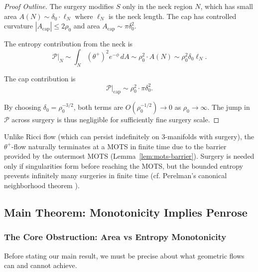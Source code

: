 \begin{proof}[Proof Outline]
The surgery modifies $S$ only in the neck region $N$, which has small area $A(N) \sim \delta_0 \cdot \ell_N$ where $\ell_N$ is the neck length. The cap has controlled curvature $|A_{\text{cap}}| \leq 2\rho_0$ and area $A_{\text{cap}} \sim \pi\delta_0^2$.

The entropy contribution from the neck is
\begin{equation}
\mathcal{P}|_N \sim \int_N (\theta^+)^2 e^{-\phi} \, dA \sim \rho_0^2 \cdot A(N) \sim \rho_0^2 \delta_0 \ell_N.
\end{equation}

The cap contribution is
\begin{equation}
\mathcal{P}|_{\text{cap}} \sim \rho_0^2 \cdot \pi\delta_0^2.
\end{equation}

By choosing $\delta_0 = \rho_0^{-3/2}$, both terms are $O(\rho_0^{-1/2}) \to 0$ as $\rho_0 \to \infty$. The jump in $\mathcal{P}$ across surgery is thus negligible for sufficiently fine surgery scale.
\end{proof}

\begin{remark}
Unlike Ricci flow (which can persist indefinitely on 3-manifolds with surgery), the $\theta^+$-flow naturally terminates at a MOTS in finite time due to the barrier provided by the outermost MOTS (Lemma~\ref{lem:mots-barrier}). Surgery is needed only if singularities form before reaching the MOTS, but the bounded entropy prevents infinitely many surgeries in finite time (cf. Perelman's canonical neighborhood theorem \cite{perelman2003}).
\end{remark}

\subsection{Main Theorem: Monotonicity Implies Penrose}

\subsubsection{The Core Obstruction: Area vs Entropy Monotonicity}

Before stating our main result, we must be precise about what geometric flows can and cannot achieve.

